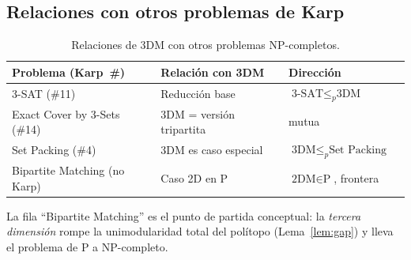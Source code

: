 \subsection{Relaciones con otros problemas de Karp}
\label{sec:complejidad:relaciones}

\begin{table}[htbp]
\centering
\caption{Relaciones de 3DM con otros problemas NP-completos.}
\label{tab:karp_rel}
\begin{tabular}{llll}
\toprule
Problema (Karp~\#) & Relación con 3DM & Dirección \\
\midrule
3-SAT (\#11) & Reducción base & $\text{3-SAT}\le_p\text{3DM}$ \\
Exact Cover by 3-Sets (\#14) & 3DM = versión tripartita & mutua \\
Set Packing (\#4) & 3DM es caso especial & $\text{3DM}\le_p\text{Set Packing}$ \\
Bipartite Matching (no Karp) & Caso 2D en P & $\text{2DM}\in\text{P}$, frontera \\
\bottomrule
\end{tabular}
\end{table}

La fila ``Bipartite Matching'' es el punto de partida conceptual: la
\emph{tercera dimensión} rompe la unimodularidad total del polítopo
(Lema~\ref{lem:gap}) y lleva el problema de P a NP-completo.
